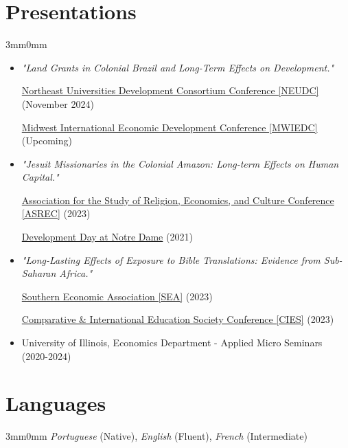 \documentclass[letterpaper,11pt]{article}
\begin{document}
\section{Presentations}
\begin{adjustwidth}{3mm}{0mm}
  \begin{itemize}
    \item \textit{"Land Grants in Colonial Brazil and Long-Term Effects on Development."}
    
    \href{https://cssh.northeastern.edu/gap/neudc-2024/}{Northeast Universities Development Consortium Conference [NEUDC]} (November 2024) 

    \href{https://publish.illinois.edu/mwiedc-uiuc/}{Midwest International Economic Development Conference [MWIEDC]} (Upcoming) 
  \end{itemize}

  \begin{itemize}
    \item \textit{"Jesuit Missionaries in the Colonial Amazon: Long-term Effects on Human Capital."}

    \href{http://www.asrec.org/conferences/}{Association for the Study of Religion, Economics, and Culture Conference [ASREC]} (2023) 

    \href{https://kellogg.nd.edu/development-day-2021#tab-2998}{Development Day at Notre Dame} (2021)     
  \end{itemize}

  \begin{itemize}
    \item \textit{"Long-Lasting Effects of Exposure to Bible Translations: Evidence from Sub-Saharan Africa."}
    
    \href{https://www.southerneconomic.org/event/7662b305-ad92-474d-8f2c-bce1240b9858/websitePage:e0a9d079-18e0-4413-a0b6-32f8f6b51e64}{Southern Economic Association [SEA]} (2023) 

    \href{https://cies2023.org/}{Comparative \& International Education Society Conference [CIES]} (2023) 
  \end{itemize}

  \begin{itemize}
    \item University of Illinois, Economics Department - Applied Micro Seminars (2020-2024)
  \end{itemize}
\end{adjustwidth}

\section{Languages}
\begin{adjustwidth}{3mm}{0mm}
\textit{Portuguese} (Native), \textit{English} (Fluent), \textit{French} (Intermediate)
\end{adjustwidth}
\end{document}
